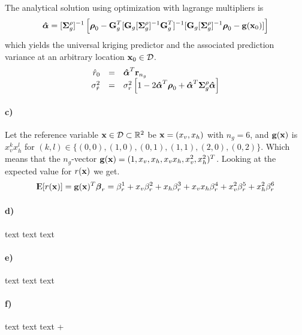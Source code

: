 The analytical solution using optimization with lagrange multipliers is
\begin{equation*}
    \boldsymbol{\mathbf{\hat{\alpha}}} = [\boldsymbol{\mathbf{\Sigma}}_g^\rho]^{-1}\left[\boldsymbol{\mathbf{\rho}}_0 - \boldsymbol{\mathbf{G}}_g^T [\boldsymbol{\mathbf{G}}_g[\boldsymbol{\mathbf{\Sigma}}_g^\rho]^{-1}\boldsymbol{\mathbf{G}}_g^T]^{-1}[\boldsymbol{\mathbf{G}}_g[\boldsymbol{\mathbf{\Sigma}}_g^\rho]^{-1}\boldsymbol{\mathbf{\rho}}_0 - \boldsymbol{\mathbf{g}}(\boldsymbol{\mathbf{x}}_0)]\right]
\end{equation*}
which yields the universal kriging predictor and the associated prediction variance at an
arbitrary location $\boldsymbol{\mathbf{x}}_0 \in \mathcal{D}$.
\begin{equation}
    \begin{array}{rcl}
         \hat{r}_0 & = & \boldsymbol{\mathbf{\hat{\alpha}}}^T \boldsymbol{\mathbf{r}}_{n_g}  \\
         \sigma_{\hat{r}}^2 & = & \sigma_r^2\left[1-2\boldsymbol{\mathbf{\hat{\alpha}}}^T \boldsymbol{\mathbf{\rho}}_0 + \boldsymbol{\mathbf{\hat{\alpha}}}^T\boldsymbol{\mathbf{\Sigma}}_g^\rho \boldsymbol{\mathbf{\hat{\alpha}}}\right] 
    \end{array}
\end{equation}
\paragraph{c)}
Let the reference variable $\boldsymbol{\mathbf{x}} \in \mathcal{D} \subset \mathbb{R}^2$ be $\boldsymbol{\mathbf{x}} = (x_v, x_h)$ with $n_g = 6$, and $\boldsymbol{\mathbf{g}}(\boldsymbol{\mathbf{x}})$ is $x_v^kx_h^l$ for $(k,l) \in \{(0,0),(1,0),(0,1),(1,1),(2,0),(0,2)\}$. Which means that the $n_g$-vector $\boldsymbol{\mathbf{g}}(\boldsymbol{\mathbf{x}}) = (1,x_v,x_h,x_vx_h,x_v^2,x_h^2)^T$. Looking at the expected value for $r(\boldsymbol{\mathbf{x}})$ we get.
\begin{equation*}
    {\rm I\kern-.3em E}[r(\boldsymbol{\mathbf{x}})] = \boldsymbol{\mathbf{g}}(\boldsymbol{\mathbf{x}})^T \boldsymbol{\mathbf{\beta}}_r = \beta_r^1 + x_v \beta_r^2 + x_h \beta_r^3 + x_v x_h \beta_r^4 + x_v^2 \beta_r^5 + x_h^2 \beta_r^6
\end{equation*}

\paragraph{d)}
text text text

\paragraph{e)}
text text text

\paragraph{f)}
text text text
+